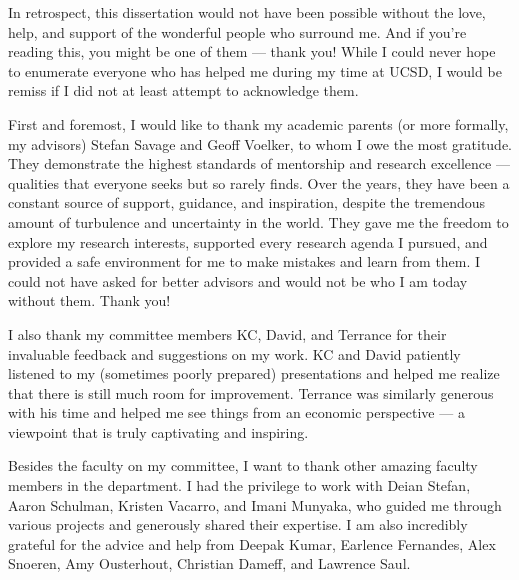 \begin{acknowledgements}
In retrospect, this dissertation would not have been possible without the love, help,  and support of the wonderful people who surround me. And if you're reading this, you might be one of them --- thank you!
While I could never hope to enumerate everyone who has helped me during my time at UCSD, I would be remiss if I did not at least attempt to acknowledge them. 


First and foremost, I would like to thank my academic parents (or more formally, my advisors) Stefan Savage and Geoff Voelker,
to whom I owe the most gratitude. They demonstrate the highest standards of mentorship and research excellence --- qualities that everyone seeks but so rarely finds.
Over the years, they have been a constant source of support, guidance, and inspiration, despite the tremendous amount of turbulence and uncertainty in the world. They gave me the freedom to explore my research interests, supported every research agenda I pursued, and provided a safe environment for me to make mistakes and learn from them. I could not have asked for better advisors and would not be who I am today without them. Thank you!


I also thank my committee members KC, David, and Terrance
for their invaluable feedback and suggestions on my work. KC and David patiently listened to my (sometimes poorly prepared) presentations and helped me realize that there is still much room for improvement. Terrance was similarly generous with his time and helped me see things from an economic perspective --- a viewpoint that is truly captivating and inspiring.

Besides the faculty on my committee, I want to thank other amazing faculty members in the department. I had the privilege to work with Deian Stefan, Aaron Schulman, Kristen Vacarro, and Imani Munyaka, who guided me through various projects and generously shared their expertise. I am also incredibly grateful for the advice and help from Deepak Kumar, Earlence Fernandes, Alex Snoeren, Amy Ousterhout, Christian Dameff, and Lawrence Saul.


\end{acknowledgements}

